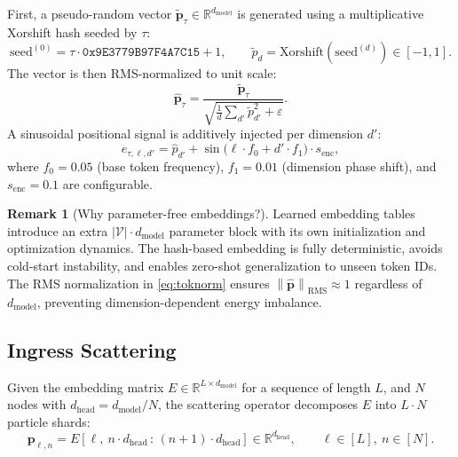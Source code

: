 \documentclass[11pt,a4paper]{article}
\theoremstyle{definition}
\newtheorem{remark}{Remark}[section]
\newcommand{\vp}{\mathbf{p}}
\newcommand{\R}{\mathbb{R}}
\newcommand{\norm}[1]{\left\lVert #1 \right\rVert}
\begin{document}
First, a pseudo-random vector $\tilde{\vp}_\tau \in \R^{d_\text{model}}$ is generated using a
multiplicative Xorshift hash seeded by $\tau$:
\begin{equation}
  \text{seed}^{(0)} = \tau \cdot \texttt{0x9E3779B97F4A7C15} + 1,
  \qquad
  \tilde{p}_d = \text{Xorshift}(\text{seed}^{(d)}) \in [-1, 1].
  \label{eq:hash}
\end{equation}
The vector is then RMS-normalized to unit scale:
\begin{equation}
  \hat{\vp}_\tau = \frac{\tilde{\vp}_\tau}{\sqrt{\frac{1}{d}\sum_{d'} \tilde{p}_{d'}^2 + \varepsilon}}.
  \label{eq:toknorm}
\end{equation}
A sinusoidal positional signal is additively injected per dimension $d'$:
\begin{equation}
  e_{\tau,\ell,d'} = \hat{p}_{d'} + \sin\!\bigl(\ell \cdot f_0 + d' \cdot f_1\bigr) \cdot s_\text{enc},
  \label{eq:posenc}
\end{equation}
where $f_0 = 0.05$ (base token frequency), $f_1 = 0.01$ (dimension phase shift), and
$s_\text{enc} = 0.1$ are configurable.

\begin{remark}[Why parameter-free embeddings?]
  Learned embedding tables introduce an extra $|\mathcal{V}| \cdot d_\text{model}$ parameter block
  with its own initialization and optimization dynamics.
  The hash-based embedding is fully deterministic, avoids cold-start instability, and enables
  zero-shot generalization to unseen token IDs.
  The RMS normalization in \eqref{eq:toknorm} ensures $\norm{\hat{\vp}}_\text{RMS} \approx 1$
  regardless of $d_\text{model}$, preventing dimension-dependent energy imbalance.
\end{remark}

\subsection{Ingress Scattering}
\label{sec:scattering}

Given the embedding matrix $E \in \R^{L \times d_\text{model}}$ for a sequence of length $L$,
and $N$ nodes with $d_\text{head} = d_\text{model}/N$, the scattering operator decomposes
$E$ into $L \cdot N$ particle shards:
\begin{equation}
  \vp_{\ell,n} = E[\ell,\ n \cdot d_\text{head}\,:\, (n{+}1) \cdot d_\text{head}] \in \R^{d_\text{head}},
  \qquad \ell \in [L],\ n \in [N].
  \label{eq:scatter}
\end{equation}
\end{document}
